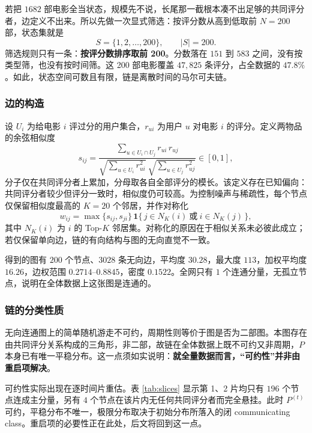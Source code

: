 \documentclass[12pt,a4paper]{ctexart}
\begin{document}
若把 $1682$ 部电影全当状态，规模先不说，长尾那一截根本凑不出足够的共同评分者，边定义不出来。所以先做一次显式筛选：按评分数从高到低取前 $N=200$ 部，状态集就是
\[
S=\{1,2,\dots,200\},\qquad |S|=200 .
\]
筛选规则只有一条：\textbf{按评分数排序取前 200}。分数落在 $151$ 到 $583$ 之间，没有按类型筛，也没有按时间筛。这 200 部电影覆盖 $47{,}825$ 条评分，占全数据的 $47.8\%$。如此，状态空间可数且有限，链是离散时间的马尔可夫链。

\subsubsection{边的构造}

设 $U_i$ 为给电影 $i$ 评过分的用户集合，$r_{ui}$ 为用户 $u$ 对电影 $i$ 的评分。定义两物品的余弦相似度
\begin{equation}
s_{ij}=\frac{\sum_{u\in U_i\cap U_j} r_{ui}\,r_{uj}}
{\sqrt{\sum_{u\in U_i} r_{ui}^{2}}\ \sqrt{\sum_{u\in U_j} r_{uj}^{2}}}\in[0,1],
\label{eq:cos}
\end{equation}
分子仅在共同评分者上累加，分母取各自全部评分的模长。该定义存在已知偏向：共同评分者较少但评分一致时，相似度仍可较高。为控制噪声与稀疏性，每个节点仅保留相似度最高的 $K=20$ 个邻居，并作对称化
\begin{equation}
w_{ij}=\max\{s_{ij},s_{ji}\}\,\mathbf{1}\{\,j\in N_K(i)\ \text{或}\ i\in N_K(j)\,\},
\label{eq:w}
\end{equation}
其中 $N_K(i)$ 为 $i$ 的 Top-$K$ 邻居集。对称化的原因在于相似关系未必彼此成立；若仅保留单向边，链的有向结构与图的无向直觉不一致。

得到的图有 $200$ 个节点、$3028$ 条无向边，平均度 $30.28$，最大度 $113$，加权平均度 $16.26$，边权范围 $0.2714$--$0.8845$，密度 $0.1522$。全网只有 $1$ 个连通分量，无孤立节点，说明在全体数据上这张图是连通的。

\subsubsection{链的分类性质}

无向连通图上的简单随机游走不可约，周期性则等价于图是否为二部图。本图存在由共同评分关系构成的三角形，非二部，故链在全体数据上既不可约又非周期，$P$ 本身已有唯一平稳分布。这一点须如实说明：\textbf{就全量数据而言，“可约性”并非由重启项解决}。

可约性实际出现在逐时间片重估。表 \ref{tab:slices} 显示第 1、2 片均只有 $196$ 个节点连成主分量，另有 $4$ 个节点在该片内无任何共同评分者而完全悬挂。此时 $P^{(t)}$ 可约，平稳分布不唯一，极限分布取决于初始分布所落入的闭 communicating class。重启项的必要性正在此处，后文将回到这一点。
\end{document}
